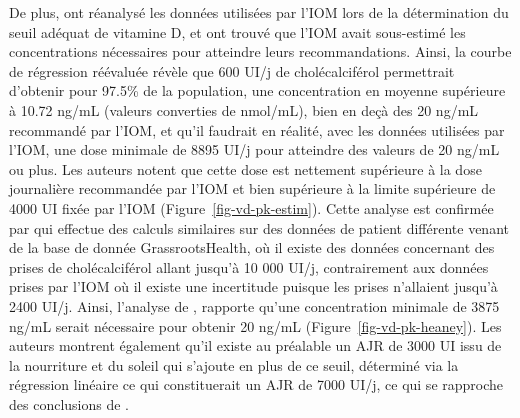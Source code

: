 \documentclass[
  a4paper,
  DIV=11,
  numbers=noendperiod,
  listof=totoc]{scrreprt}
\begin{document}
De plus, \textcite{Veugelers.2014} ont réanalysé les données utilisées
par l'IOM lors de la détermination du seuil adéquat de vitamine D, et
ont trouvé que l'IOM avait sous-estimé les concentrations nécessaires
pour atteindre leurs recommandations. Ainsi, la courbe de régression
réévaluée révèle que 600 UI/j de cholécalciférol permettrait d'obtenir
pour 97.5\% de la population, une concentration en moyenne supérieure à
10.72 ng/mL (valeurs converties de nmol/mL), bien en deçà des 20 ng/mL
recommandé par l'IOM, et qu'il faudrait en réalité, avec les données
utilisées par l'IOM, une dose minimale de 8895 UI/j pour atteindre des
valeurs de 20 ng/mL ou plus. Les auteurs notent que cette dose est
nettement supérieure à la dose journalière recommandée par l'IOM et bien
supérieure à la limite supérieure de 4000 UI fixée par l'IOM
(Figure~\ref{fig-vd-pk-estim}). Cette analyse est confirmée par
\textcite{Heaney.2015} qui effectue des calculs similaires sur des
données de patient différente venant de la base de donnée
GrassrootsHealth, où il existe des données concernant des prises de
cholécalciférol allant jusqu'à 10 000 UI/j, contrairement aux données
prises par l'IOM où il existe une incertitude puisque les prises
n'allaient jusqu'à 2400 UI/j. Ainsi, l'analyse de
\textcite{Heaney.2015}, rapporte qu'une concentration minimale de 3875
ng/mL serait nécessaire pour obtenir 20 ng/mL
(Figure~\ref{fig-vd-pk-heaney}). Les auteurs montrent également qu'il
existe au préalable un AJR de 3000 UI issu de la nourriture et du soleil
qui s'ajoute en plus de ce seuil, déterminé via la régression linéaire
ce qui constituerait un AJR de 7000 UI/j, ce qui se rapproche des
conclusions de \textcite{Veugelers.2014}.
\end{document}
